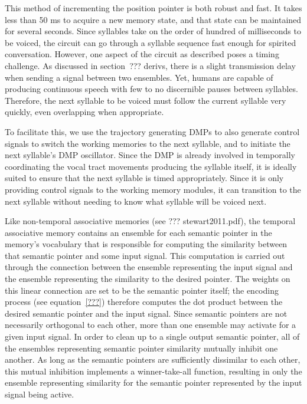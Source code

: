 This method of incrementing the position pointer
is both robust and fast.
It takes less than 50 ms to acquire
a new memory state,
and that state can be maintained
for several seconds.
Since syllables take
on the order of hundred of milliseconds
to be voiced,
the circuit can go through a syllable sequence
fast enough for spirited conversation.
However, one aspect of the circuit as described
poses a timing challenge.
As discussed in section~??? derivs,
there is a slight transmission delay
when sending a signal between two ensembles.
Yet, humans are capable of producing
continuous speech with
few to no discernible pauses between syllables.
Therefore, the next syllable to be voiced
must follow the current syllable very quickly,
even overlapping when appropriate.

To facilitate this,
we use the trajectory generating DMPs
to also generate control signals
to switch the working memories
to the next syllable,
and to initiate the next syllable's DMP oscillator.
Since the DMP is already involved in
temporally coordinating
the vocal tract movements
producing the syllable itself,
it is ideally suited to
ensure that the next syllable
is timed appropriately.
Since it is only providing control signals
to the working memory modules,
it can transition to the next syllable
without needing to know
what syllable will be voiced next.

Like non-temporal associative memories
(see ??? stewart2011.pdf),
the temporal associative memory
contains an ensemble
for each semantic pointer
in the memory's vocabulary
that is responsible for computing
the similarity between
that semantic pointer
and some input signal.
This computation is carried out
through the connection between
the ensemble representing the input signal
and the ensemble representing
the similarity to the desired pointer.
The weights on this linear connection
are set to be the semantic pointer itself;
the encoding process (see equation~\eqref{???})
therefore computes the dot product
between the desired semantic pointer
and the input signal.
Since semantic pointers are not necessarily
orthogonal to each other,
more than one ensemble may activate
for a given input signal.
In order to clean up to a single
output semantic pointer,
all of the ensembles
representing semantic pointer similarity
mutually inhibit one another.
As long as the semantic pointers
are sufficiently dissimilar
to each other,
this mutual inhibition
implements a winner-take-all function,
resulting in only the ensemble
representing similarity for the
semantic pointer represented by
the input signal being active.

